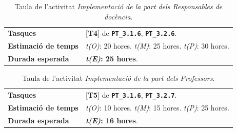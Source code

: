 \documentclass[a4paper,12pt]{ThesisStyle}
\begin{document}
\begin{table}[H]
  \begin{tabularx}{\textwidth}{l | X}
    \toprule
    \rowcolor{Blue}
    \multicolumn{2}{c}{\texttt{\textbf{A15:}} Implementació de la part dels Responsables de docència}\\
    \midrule[0.9pt]
    \textbf{Tasques}                 & [\textbf{T4}] de \texttt{\textbf{PT\_3.1.6}}, \texttt{\textbf{PT\_3.2.6}}.\\
    \midrule
    \textbf{Estimació de temps}      & \textit{t(O)}: 20 hores.
    \newline \textit{t(M)}: 25 hores.
    \newline \textit{t(P)}: 30 hores.\\
    \midrule
    \textbf{Durada esperada}         & \textbf{\textit{t(E)}: 25 hores}.\\
    \bottomrule
  \end{tabularx}
  \caption{\label{taula:a15} Taula de l'activitat \emph{Implementació de la part dels Responsables de docència}.}
\end{table}

\begin{table}[H]
  \begin{tabularx}{\textwidth}{l | X}
    \toprule
    \rowcolor{Blue}
    \multicolumn{2}{c}{\texttt{\textbf{A16:}} Implementació de la part dels Professors}\\
    \midrule[0.9pt]
    \textbf{Tasques}                 & [\textbf{T5}] de \texttt{\textbf{PT\_3.1.6}}, \texttt{\textbf{PT\_3.2.7}}.\\
    \midrule
    \textbf{Estimació de temps}      & \textit{t(O)}: 10 hores.
    \newline \textit{t(M)}: 15 hores.
    \newline \textit{t(P)}: 25 hores.\\
    \midrule
    \textbf{Durada esperada}         & \textbf{\textit{t(E)}: 16 hores}.\\
    \bottomrule
  \end{tabularx}
  \caption{\label{taula:a16} Taula de l'activitat \emph{Implementació de la part dels Professors}.}
\end{table}
\end{document}
